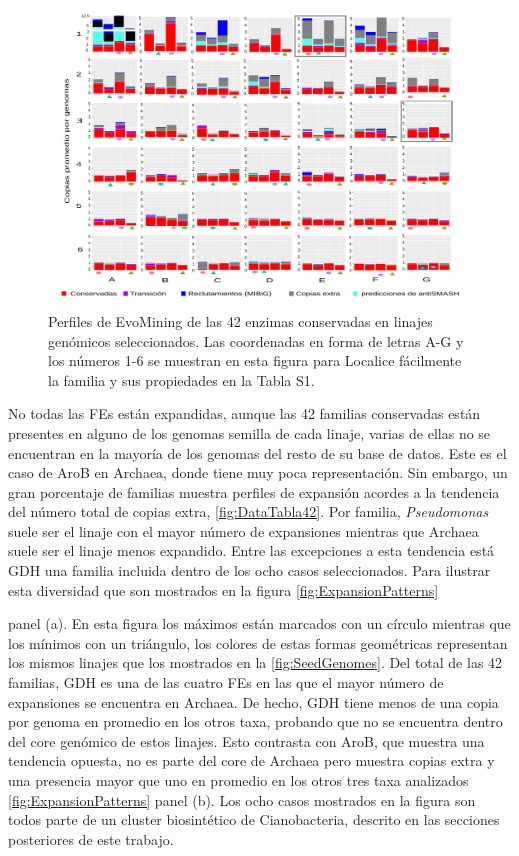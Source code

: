 \documentclass[12pt,twoside]{reedthesis}
\begin{document}
  \begin{figure}[h!tbp]
  \centering
  \includegraphics[angle = 0,scale = .6]{chapter2/FigurasPaper/Figure3S.pdf}
  \caption[Expansiones de las 42 enzimas comunes en Actinobacteria, Cyanobacteria, $Pseudomonas$ y Archaea]{\footnotesize{Perfiles de EvoMining  de las 42 enzimas conservadas en linajes genómicos seleccionados. Las coordenadas en forma de letras A-G y los números 1-6 se muestran en esta figura para
  Localice fácilmente la familia y sus propiedades en la Tabla S1.}}
  \label{fig:42Expansiones}
  \end{figure}
  
  No todas las FEs están expandidas, aunque las 42 familias conservadas
  están presentes en alguno de los genomas semilla de cada linaje, varias
  de ellas no se encuentran en la mayoría de los genomas del resto de su
  base de datos. Este es el caso de AroB en Archaea, donde tiene muy poca
  representación. Sin embargo, un gran porcentaje de familias muestra
  perfiles de expansión acordes a la tendencia del número total de copias
  extra, \autoref{fig:DataTabla42}. Por familia, \emph{Pseudomonas} suele
  ser el linaje con el mayor número de expansiones mientras que Archaea
  suele ser el linaje menos expandido. Entre las excepciones a esta
  tendencia está GDH una familia incluida dentro de los ocho casos
  seleccionados. Para ilustrar esta diversidad que son mostrados en la
  figura \autoref{fig:ExpansionPatterns}
  
  panel (a). En esta figura los máximos están marcados con un círculo
  mientras que los mínimos con un triángulo, los colores de estas formas
  geométricas representan los mismos linajes que los mostrados en la
  \autoref{fig:SeedGenomes}. Del total de las 42 familias, GDH es una de
  las cuatro FEs en las que el mayor número de expansiones se encuentra en
  Archaea. De hecho, GDH tiene menos de una copia por genoma en promedio
  en los otros taxa, probando que no se encuentra dentro del core genómico
  de estos linajes. Esto contrasta con AroB, que muestra una tendencia
  opuesta, no es parte del core de Archaea pero muestra copias extra y una
  presencia mayor que uno en promedio en los otros tres taxa analizados
  \autoref{fig:ExpansionPatterns} panel (b). Los ocho casos mostrados en
  la figura son todos parte de un cluster biosintético de Cianobacteria,
  descrito en las secciones posteriores de este trabajo.
  
\end{document}
